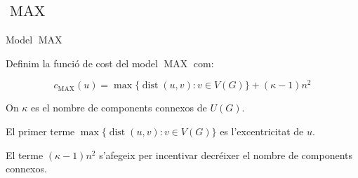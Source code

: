 \documentclass[aspectratio=169,handout]{beamer}
\DeclareMathOperator{\dist}{dist}
\DeclareMathOperator{\MAX}{MAX}
\begin{document}
\subsection{\texorpdfstring{$\MAX$}{MAX}}
\begin{frame}{Model $\MAX$}

Definim la funció de cost del model $\MAX$ com:

\begin{equation}
    c_{\MAX}(u) = \max \{ \dist(u, v) : v \in V(G) \} + (\kappa - 1)n^2
\end{equation}

On $\kappa$ es el nombre de components connexos de $U(G)$.

\vspace{2em}

El primer terme $\max \{ \dist(u, v) : v \in V(G) \}$ es l'excentricitat de $u$.

El terme $(\kappa - 1)n^2$ s'afegeix per incentivar decréixer el nombre de components connexos.

\end{frame}
\end{document}
